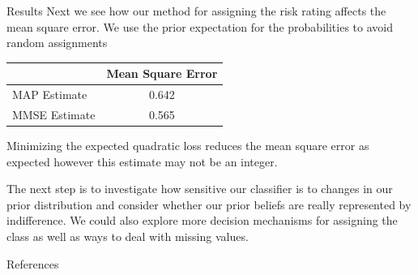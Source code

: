 \documentclass{beamer}
\begin{document}
\begin{frame}
\begin{columns}
\begin{column}{0.25\paperwidth}
\begin{block}{Results}
			Next we see how our method for assigning the risk rating affects the mean square error. We use the prior expectation for the probabilities to avoid random assignments
			\begin{center}
				\begin{tabular}{ l|c }
					              & Mean Square Error   \\
					\hline
					MAP Estimate  & 0.642 \\
					MMSE Estimate & 0.565
				\end{tabular}
			\end{center}
			Minimizing the expected quadratic loss reduces the mean square error as expected however this estimate may not be an integer.

			The next step is to investigate how sensitive our classifier is to changes in our prior distribution and consider whether our prior beliefs are really represented by indifference.
			We could also explore more decision mechanisms for assigning the class as well as ways to deal with missing values.
		\end{block}

		\begin{block}{\small References}
			{\footnotesize
			{}}
			
		\end{block}

	\end{column}
\end{columns}
\end{frame}
\end{document}
